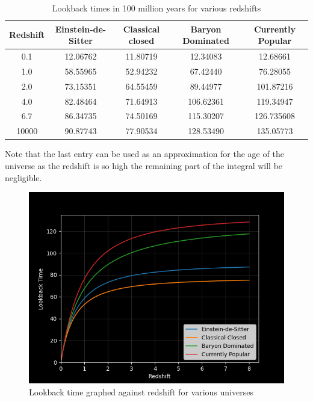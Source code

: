 \documentclass{article}
\begin{document}
\begin{table}[!h]
	\centering
	\begin{tabular}{ |c|cccc| }
		\hline
		Redshift & Einstein-de-Sitter & Classical closed & Baryon Dominated & Currently Popular \\ \hline \hline
		0.1      & 12.06762           & 11.80719         & 12.34083         & 12.68661          \\ \hline
		1.0      & 58.55965           & 52.94232         & 67.42440         & 76.28055          \\ \hline
		2.0      & 73.15351           & 64.55459         & 89.44977         & 101.87216         \\ \hline
		4.0      & 82.48464           & 71.64913         & 106.62361        & 119.34947         \\ \hline
		6.7      & 86.34735           & 74.50169         & 115.30207        & 126.735608        \\ \hline
		10000    & 90.87743           & 77.90534         & 128.53490        & 135.05773         \\ \hline
	\end{tabular}
	\caption{Lookback times in 100 million years for various redshifts}
\end{table}

Note that the last entry can be used as an approximation for the age of the universe as the redshift is so high the remaining part of the integral will be negligible.

\begin{figure}[ht!]
	\includegraphics[width=\textwidth]{LookbackTimes.png}
	\caption{Lookback time graphed against redshift for various universes}\label{fig:my_label}
\end{figure}
\end{document}
